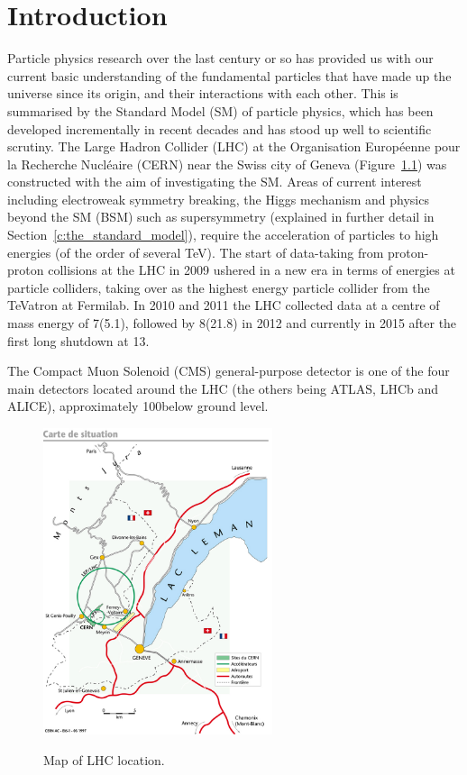 \chapter{Introduction}
\label{c:introduction}
Particle physics research over the last century or so has provided us with our current basic understanding of
the fundamental particles that have made up the universe since its origin, and their interactions with each
other. This is summarised by the Standard Model (SM) of particle physics, which has been developed
incrementally in recent decades and has stood up well to scientific scrutiny. The Large Hadron Collider (LHC)
at the Organisation Europ\'{e}enne pour la Recherche Nucl\'{e}aire (CERN) near the Swiss city of Geneva
(Figure~\ref{fig:LHC_map}) was constructed with the aim of investigating the SM. Areas of current interest
including electroweak symmetry breaking, the Higgs mechanism and physics beyond the SM (BSM) such as
supersymmetry (explained in further detail in Section~\ref{c:the_standard_model}), require the acceleration of
particles to high energies (of the order of several TeV). The start of data-taking from proton-proton
collisions at the LHC in 2009 ushered in a new era in terms of energies at particle colliders, taking over as
the highest energy particle collider from the TeVatron at Fermilab. In 2010 and 2011 the LHC collected data at
a centre of mass energy of 7\TeV (5.1\fbinv), followed by 8\TeV (21.8\fbinv) in 2012 and currently in 2015
after the first long shutdown at 13\TeV.

The Compact Muon Solenoid (CMS) general-purpose detector is one of the four main detectors located around the
LHC (the others being ATLAS, LHCb and ALICE), approximately 100\m below ground level.

\begin{figure}[!hbtp]
   \centering
     \includegraphics[width=0.6\textwidth]{Chapters/01_Introduction/Images/lhc-pho-1997-169.jpg}\\
     \caption{Map of LHC location.}
     \label{fig:LHC_map}
\end{figure}


